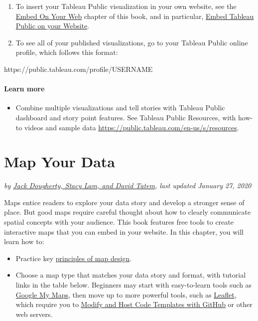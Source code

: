 \documentclass[
  english,
]{book}
\newenvironment{Shaded}{\begin{snugshade}}{\end{snugshade}}
\newcommand{\NormalTok}[1]{#1}
\providecommand{\tightlist}{%
  \setlength{\itemsep}{0pt}\setlength{\parskip}{0pt}}
\begin{document}
\begin{enumerate}
\def\labelenumi{\arabic{enumi})}
\setcounter{enumi}{19}
\item
  To insert your Tableau Public visualization in your own website, see the \href{embed}{Embed On Your Web} chapter of this book, and in particular, \href{iframe-tableau}{Embed Tableau Public on your Website}.
\item
  To see all of your published visualizations, go to your Tableau Public online profile, which follows this format:
\end{enumerate}

\begin{Shaded}
\begin{Highlighting}[]
\NormalTok{https://public.tableau.com/profile/USERNAME}
\end{Highlighting}
\end{Shaded}

\hypertarget{learn-more-10}{%
\subsubsection*{Learn more}\label{learn-more-10}}

\begin{itemize}
\tightlist
\item
  Combine multiple visualizations and tell stories with Tableau Public dashboard and story point features. See Tableau Public Resources, with how-to videos and sample data \url{https://public.tableau.com/en-us/s/resources}.
\end{itemize}

\hypertarget{map}{%
\chapter{Map Your Data}\label{map}}

\emph{by \href{authors}{Jack Dougherty, Stacy Lam, and David Tatem}, last updated January 27, 2020}

Maps entice readers to explore your data story and develop a stronger sense of place. But good maps require careful thought about how to clearly communicate spatial concepts with your audience. This book features free tools to create interactive maps that you can embed in your website. In this chapter, you will learn how to:

\begin{itemize}
\tightlist
\item
  Practice key \href{map-design}{principles of map design}.
\item
  Choose a map type that matches your data story and format, with tutorial links in the table below.
  Beginners may start with easy-to-learn tools such as \href{mymaps}{Google My Maps}, then move up to more powerful tools, such as \href{leaflet}{Leaflet}, which require you to \href{github}{Modify and Host Code Templates with GitHub} or other web servers.
\end{itemize}
\end{document}
